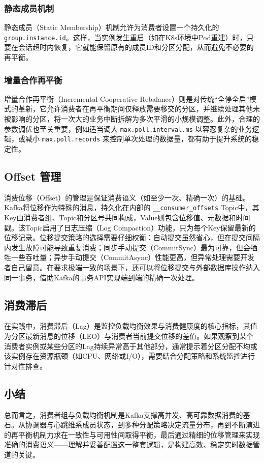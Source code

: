 \subsubsection{静态成员机制}静态成员（Static Membership）机制允许为消费者设置一个持久化的 \texttt{group.instance.id}。这样，当实例发生重启（如在K8s环境中Pod重建）时，只要在会话超时内恢复，它就能保留原有的成员ID和分区分配，从而避免不必要的再平衡。
\subsubsection{增量合作再平衡}增量合作再平衡（Incremental Cooperative Rebalance）则是对传统“全停全启”模式的革新，它允许消费者在再平衡期间仅释放需要移交的分区，并继续处理其他未被影响的分区，将一次大的业务中断拆解为多次平滑的小规模调整。此外，合理的参数调优也至关重要，例如适当调大 \texttt{max.poll.interval.ms} 以容忍复杂的业务逻辑，或减小 \texttt{max.poll.records} 来控制单次处理的数据量，都有助于提升系统的稳定性。

\subsection{Offset 管理}消费位移（Offset）的管理是保证消费语义（如至少一次、精确一次）的基础。Kafka将位移作为特殊的消息，持久化在内部的 \texttt{\_\_consumer\_offsets} Topic中，其Key由消费者组、Topic和分区号共同构成，Value则包含位移值、元数据和时间戳。该Topic启用了日志压缩（Log Compaction）功能，只为每个Key保留最新的位移记录。位移提交策略的选择需要仔细权衡：自动提交虽然省心，但在提交间隔内发生故障可能导致重复消费；同步手动提交（CommitSync）最为可靠，但会牺牲一些吞吐量；异步手动提交（CommitAsync）性能更高，但异常处理需要开发者自己留意。在要求极端一致的场景下，还可以将位移提交与外部数据库操作纳入同一事务，借助Kafka的事务API实现端到端的精确一次处理。

\subsection{消费滞后}在实践中，消费滞后（Lag）是监控负载均衡效果与消费健康度的核心指标，其值为分区最新消息的位移（LEO）与消费者当前提交位移的差值。如果观察到某个消费者实例或某些分区的Lag持续异常高于其他部分，通常提示着分区分配不均或该实例存在资源瓶颈（如CPU、网络或I/O），需要结合分配策略和系统监控进行针对性排查。

\subsection{小结}总而言之，消费者组与负载均衡机制是Kafka支撑高并发、高可靠数据消费的基石。从协调器与心跳维系成员状态，到多种分配策略决定流量分布，再到不断演进的再平衡机制力求在一致性与可用性间取得平衡，最后通过精细的位移管理来实现准确的消费语义——理解并妥善配置这一整套逻辑，是构建高效、稳定实时数据管道的关键。
